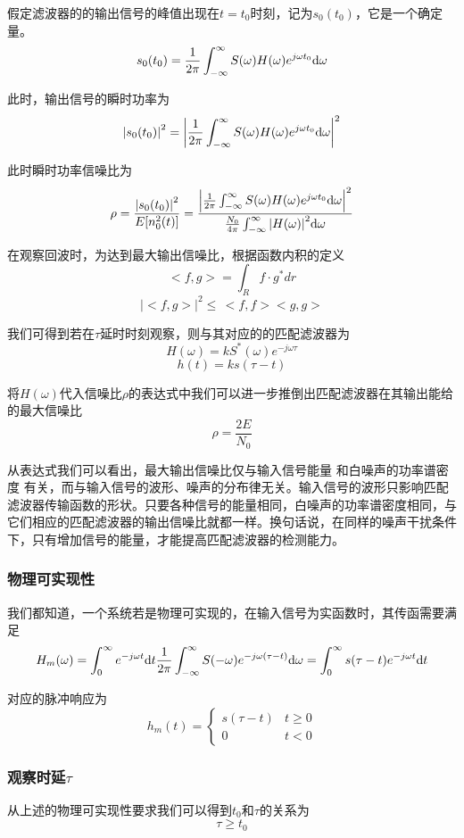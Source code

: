 \documentclass[a4paper]{article}
\begin{document}
假定滤波器的的输出信号的峰值出现在$t = {t_0}$时刻，记为${s_0}({t_0})$，它是一个确定量。
$${s_0}({t_0}) = \frac{1}{{2\pi }}\int_{ - \infty }^\infty  {S(\omega )H(\omega ){e^{j\omega {t_0}}}{\rm{d}}\omega } $$


此时，输出信号的瞬时功率为
$${\left| {{s_0}({t_0})} \right|^2} = {\left| {\frac{1}{{2\pi }}\int_{ - \infty }^\infty  {S(\omega )H(\omega ){e^{j\omega {t_0}}}{\rm{d}}\omega } } \right|^2}$$

此时瞬时功率信噪比为
$$\rho  = \frac{{{{\left| {{s_0}({t_0})} \right|}^2}}}{{E[n_0^2(t)]}}= \frac{{{{\left| {\frac{1}{{2\pi }}\int_{ - \infty }^\infty  {S(\omega )H(\omega ){e^{j\omega {t_0}}}{\rm{d}}\omega } } \right|}^2}}}{{\frac{{{N_0}}}{{4\pi }}\int_{ - \infty }^\infty  {{{\left| {H(\omega )} \right|}^2}{\rm{d}}\omega } }}$$

在观察回波时，为达到最大输出信噪比，根据函数内积的定义
$$<f,g>={\int_R f \cdot g^* dr}$$
$$|<f,g>|^2 \leq\, <f,f><g,g>$$

我们可得到若在\(\tau\)延时时刻观察，则与其对应的的匹配滤波器为
$${H}(\omega ) = k{S^ * }(\omega ){e^{ - j\omega {\tau}}}$$
$$h(t)=ks(\tau-t)$$

将\({H}(\omega )\)代入信噪比$\rho$的表达式中我们可以进一步推倒出匹配滤波器在其输出能给的最大信噪比$$\rho=\frac{2E}{N_0}$$

从表达式我们可以看出，最大输出信噪比仅与输入信号能量 和白噪声的功率谱密度 有关，而与输入信号的波形、噪声的分布律无关。输入信号的波形只影响匹配滤波器传输函数的形状。只要各种信号的能量相同，白噪声的功率谱密度相同，与它们相应的匹配滤波器的输出信噪比就都一样。换句话说，在同样的噪声干扰条件下，只有增加信号的能量，才能提高匹配滤波器的检测能力。

\subsubsection{物理可实现性}
我们都知道，一个系统若是物理可实现的，在输入信号为实函数时，其传函需要满足
$${H_m}(\omega ) = \int_0^\infty  {{e^{ - j\omega t}}} {\rm{d}}t\frac{1}{{2\pi }}\int_{ - \infty }^\infty  {S( - \omega ){e^{ - j\omega ({\tau} - t)}}} {\rm{d}}\omega  = \int_0^\infty  {s({\tau} - t){e^{ - j\omega t}}} {\rm{d}}t$$

对应的脉冲响应为
$${h_m}(t) = \left\{ {\begin{array}{*{20}{c}}
{s({\tau} - t)}&{t \ge 0}\\
0&{t < 0}
\end{array}} \right.$$
\subsubsection{观察时延$\tau$}
从上述的物理可实现性要求我们可以得到$t_0$和$\tau$的关系为$$\tau \ge t_{0}$$
\end{document}
